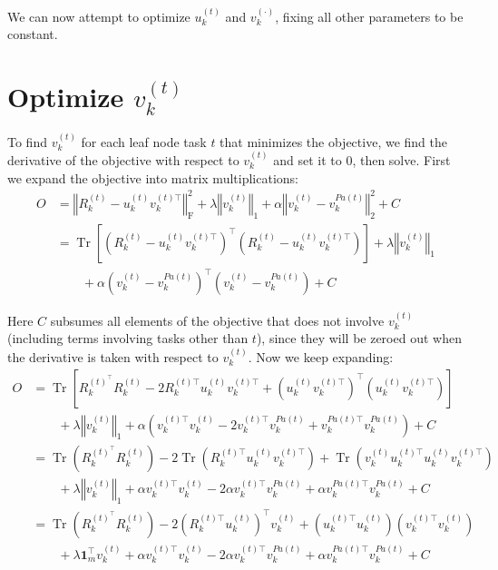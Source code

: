 \documentclass{article}
\DeclareMathOperator{\Tr}{Tr}
\begin{document}
We can now attempt to optimize $u^{(t)}_{k}$ and $v^{(\cdot)}_{k}$, fixing all other parameters to be constant. 

\medskip
\section*{Optimize $v^{(t)}_{k}$}
To find $v^{(t)}_{k}$ for each leaf node task $t$ that minimizes the objective, we find the derivative of the objective with respect to $v^{(t)}_{k}$ and set it to 0, then solve. First we expand the objective into matrix multiplications:
\begin{align}
O &= 
\left\Vert R^{(t)}_k - u^{(t)}_{k} v^{(t)\top}_{k}\right\Vert_\text{F}^2
+\lambda \left\Vert v_k^{(t)} \right\Vert_1 
+\alpha \left\Vert v^{(t)}_{k} - v^{Pa(t)}_{k} \right\Vert_\text{2}^2 
+ C \\
&=
\Tr \left[
\left( R^{(t)}_k - u^{(t)}_{k} v^{(t)\top}_{k} \right)^\top \left( R^{(t)}_k - u^{(t)}_{k} v^{(t)\top}_{k} \right) \right]
+\lambda \left\Vert v_k^{(t)} \right\Vert_1 \\
&\quad\quad+\alpha  \left( v^{(t)}_{k} - v^{Pa(t)}_{k} \right)^\top \left( v^{(t)}_{k} - v^{Pa(t)}_{k} \right)
+ C
\end{align}

Here $C$ subsumes all elements of the objective that does not involve $v^{(t)}_{k}$ (including terms involving tasks other than $t$), since they will be zeroed out when the derivative is taken with respect to $v^{(t)}_{k}$. Now we keep expanding:
\begin{align}
O &= 
\Tr \left[
R^{(t)^\top}_k R^{(t)}_k 
- 2R^{(t)\top}_k u^{(t)}_{k} v^{(t)\top}_{k} 
+ \left( 
u^{(t)}_{k} v^{(t)\top}_{k} \right)^\top \left( u^{(t)}_{k} v^{(t)\top}_{k} 
\right) 
\right] \\
&\quad\quad 
+\lambda \left\Vert v_k^{(t)} \right\Vert_1
+ \alpha 
\left( v^{(t)\top}_{k} v^{(t)}_{k} - 2 v^{(t)\top}_{k} v^{Pa(t)}_{k} + v^{Pa(t)\top}_{k} v^{Pa(t)}_{k} \right)
+ C \\
&= \Tr \left( R^{(t)^\top}_k R^{(t)}_k \right)
- 2 \Tr \left( R^{(t)\top}_ku^{(t)}_{k} v^{(t)\top}_{k} \right)
+  \Tr \left( v^{(t)}_{k}  u^{(t)\top}_{k}   u^{(t)}_{k} v^{(t)\top}_{k} \right)
\\
&\quad\quad
+\lambda \left\Vert v_k^{(t)} \right\Vert_1
+ \alpha v^{(t)\top}_{k} v^{(t)}_{k} - 2 \alpha v^{(t)\top}_{k}v^{Pa(t)}_{k} + \alpha v^{Pa(t)\top}_{k} v^{Pa(t)}_{k}
+ C \\
&= \Tr \left( R^{(t)^\top}_k R^{(t)}_k \right)
- 2 \left( R^{(t)\top}_ku^{(t)}_{k}  \right)^\top v^{(t)}_{k} 
+  \left( u^{(t)\top}_{k}   u^{(t)}_{k} \right)\left( v^{(t)\top}_{k} v^{(t)}_{k}  \right) 
 \label{eqn:leafv1} \\
&\quad\quad
+ \lambda \boldsymbol{1}_m^\top  v_k^{(t)}
+ \alpha v^{(t)\top}_{k} v^{(t)}_{k} - 2 \alpha v^{(t)\top}_{k}v^{Pa(t)}_{k} 
+ \alpha v^{Pa(t)\top}_{k} v^{Pa(t)}_{k}
+ C \label{eqn:leafv2}
\end{align}
\end{document}
